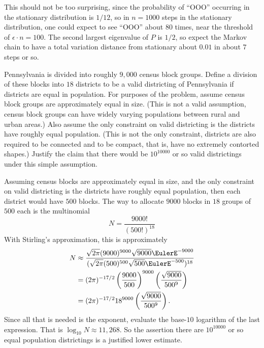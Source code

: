 \documentclass[12pt]{article}
\begin{document}
\begin{example}
\begin{solution}
    This should not be too surprising, since the probability of ``OOO''
    occurring in the stationary distribution is \( 1/12 \), so in \(
    n=1000 \) steps in the stationary distribution, one could expect to
    see ``OOO'' about \( 80 \) times, near the threshold of \( \epsilon
    \cdot n = 100 \).  The second largest eigenvalue of \( P \) is \(
    1/2 \), so expect the Markov chain to have a total variation
    distance from stationary about \( 0.01 \) in about \( 7 \) steps or
    so.
\end{solution}

\begin{exercise}
    Pennsylvania is divided into roughly \( 9{,}000 \) census block
    groups.  Define a division of these blocks into \( 18 \) districts
    to be a valid districting of Pennsylvania if districts are equal in
    population.  For purposes of the problem, assume census block groups
    are approximately equal in size.  (This is not a valid assumption,
    census block groups can have widely varying populations between
    rural and urban areas.) Also assume the only constraint on valid
    districting is the districts have roughly equal population.  (This
    is not the only constraint, districts are also required to be
    connected and to be compact, that is, have no extremely contorted
    shapes.) Justify the claim that there would be \( 10^{10000} \) or
    so valid districtings under this simple assumption.
\end{exercise}

\begin{solution}
    Assuming census blocks are approximately equal in size, and the only
    constraint on valid districting is the districts have roughly equal
    population, then each district would have \( 500 \) blocks.  The way
    to allocate \( 9000 \) blocks in \( 18 \) groups of \( 500 \) each
    is the multinomial
    \[
        N = \frac{9000!}{(500!)^{18}}
    \] With Stirling's approximation, this is approximately
    \begin{align*}
        N &\approx \frac{\sqrt{2\pi} (9000)^{9000} \sqrt{9000} \EulerE^{-9000}}
        {(\sqrt{2\pi} (500)^{500} \sqrt{500} \EulerE^{-500})^{18}} \\
        &= (2\pi)^{-17/2} \left( \frac{9000}{500} \right)^{9000} \left(
        \frac{\sqrt{9000}}{500^{9}} \right) \\
        &= (2\pi)^{-17/2} 18^{9000} \left( \frac{\sqrt{9000}}{500^{9}}
        \right).  \\
    \end{align*}
    Since all that is needed is the exponent, evaluate the base-\( 10 \)
    logarithm of the last expression.  That is \( \log_{10} N \approx 11
    {,}268 \).  So the assertion there are \( 10^{10000} \) or so equal
    population districtings is a justified lower estimate.


\end{solution}
\end{example}
\end{document}
